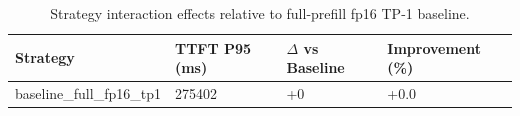 \begin{table}
\caption{Strategy interaction effects relative to full-prefill fp16 TP-1 baseline.}
\label{tab:interactions}
\begin{tabular}{llll}
\toprule
Strategy & TTFT P95 (ms) & $\Delta$ vs Baseline & Improvement (\%) \\
\midrule
baseline\_full\_fp16\_tp1 & 275402 & +0 & +0.0 \\
\bottomrule
\end{tabular}
\end{table}
